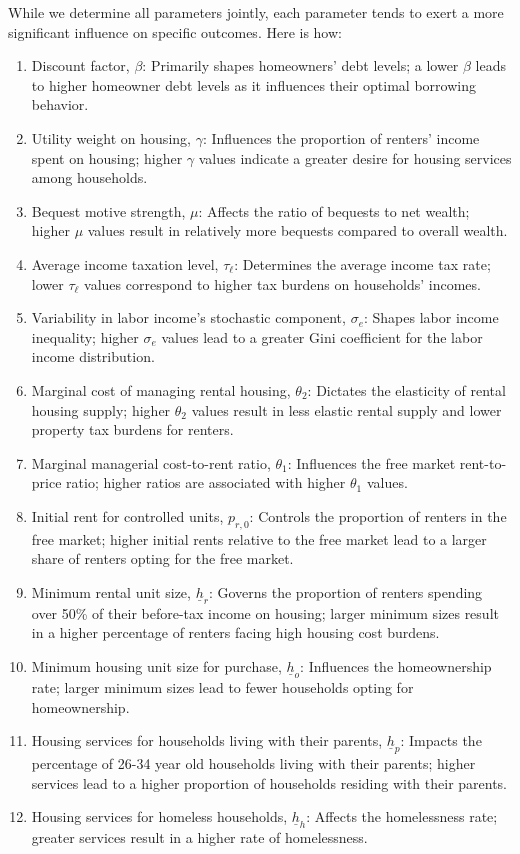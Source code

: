 \documentclass[parskip=full]{article}
\begin{document}
While we determine all parameters jointly, each parameter tends to exert a more significant influence on specific outcomes. Here is how:
\begin{enumerate}
    \item Discount factor, $\beta$: Primarily shapes homeowners' debt levels; a lower $\beta$ leads to higher homeowner debt levels as it influences their optimal borrowing behavior.
    \item Utility weight on housing, $\gamma$: Influences the proportion of renters' income spent on housing; higher $\gamma$ values indicate a greater desire for housing services among households.
    \item Bequest motive strength, $\mu$: Affects the ratio of bequests to net wealth; higher $\mu$ values result in relatively more bequests compared to overall wealth.
    \item Average income taxation level, $\tau_{\ell}$: Determines the average income tax rate; lower $\tau_{\ell}$ values correspond to higher tax burdens on households' incomes.
    \item Variability in labor income's stochastic component, $\sigma_{e}$: Shapes labor income inequality; higher $\sigma_{e}$ values lead to a greater Gini coefficient for the labor income distribution.
    \item Marginal cost of managing rental housing, $\theta_{2}$: Dictates the elasticity of rental housing supply; higher $\theta_{2}$ values result in less elastic rental supply and lower property tax burdens for renters.
    \item Marginal managerial cost-to-rent ratio, $\theta_{1}$: Influences the free market rent-to-price ratio; higher ratios are associated with higher $\theta_{1}$ values.
    \item Initial rent for controlled units, $p_{r,0}$: Controls the proportion of renters in the free market; higher initial rents relative to the free market lead to a larger share of renters opting for the free market.
    \item Minimum rental unit size, $\underline{h}_{r}$: Governs the proportion of renters spending over 50\% of their before-tax income on housing; larger minimum sizes result in a higher percentage of renters facing high housing cost burdens.
    \item Minimum housing unit size for purchase, $\underline{h}_{o}$: Influences the homeownership rate; larger minimum sizes lead to fewer households opting for homeownership.
    \item Housing services for households living with their parents, $\underline{h}_{p}$: Impacts the percentage of 26-34 year old households living with their parents; higher services lead to a higher proportion of households residing with their parents.
    \item Housing services for homeless households, $\underline{h}_{h}$: Affects the homelessness rate; greater services result in a higher rate of homelessness.
\end{enumerate}
\end{document}
